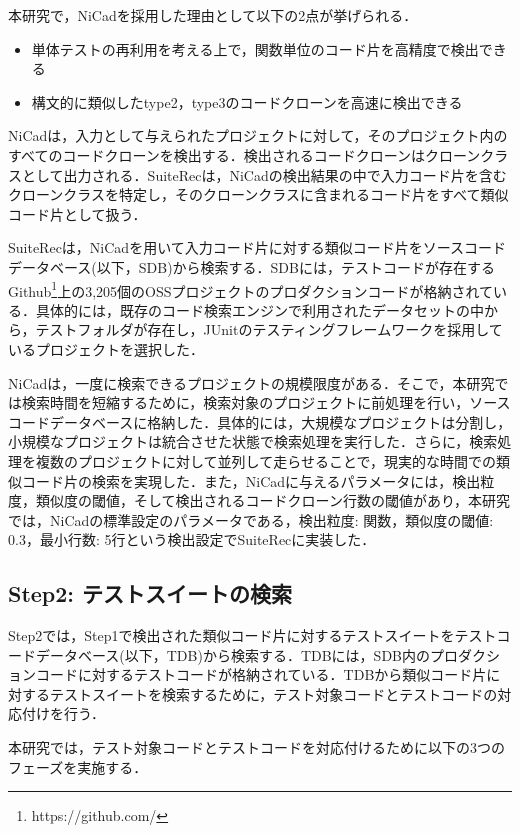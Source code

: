 \documentclass[12pt]{jarticle} %
\begin{document}
本研究で，{\sf NiCad}を採用した理由として以下の2点が挙げられる．

\begin{itemize}
\item 単体テストの再利用を考える上で，関数単位のコード片を高精度で検出できる
\item 構文的に類似したtype2，type3のコードクローンを高速に検出できる
\end{itemize}


{\sf NiCad}は，入力として与えられたプロジェクトに対して，そのプロジェクト内のすべてのコードクローンを検出する．検出されるコードクローンはクローンクラスとして出力される．{\sf SuiteRec}は，{\sf NiCad}の検出結果の中で入力コード片を含むクローンクラスを特定し，そのクローンクラスに含まれるコード片をすべて類似コード片として扱う．

{\sf SuiteRec}は，{\sf NiCad}を用いて入力コード片に対する類似コード片をソースコードデータベース(以下，SDB)から検索する．SDBには，テストコードが存在するGithub\footnote{https://github.com/}上の3,205個のOSSプロジェクトのプロダクションコードが格納されている．具体的には，既存のコード検索エンジンで利用されたデータセット\cite{FaCoY}の中から，テストフォルダが存在し，JUnitのテスティングフレームワークを採用しているプロジェクトを選択した．

{\sf NiCad}は，一度に検索できるプロジェクトの規模限度がある．そこで，本研究では検索時間を短縮するために，検索対象のプロジェクトに前処理を行い，ソースコードデータベースに格納した．具体的には，大規模なプロジェクトは分割し，小規模なプロジェクトは統合させた状態で検索処理を実行した．さらに，検索処理を複数のプロジェクトに対して並列して走らせることで，現実的な時間での類似コード片の検索を実現した．また，{\sf NiCad}に与えるパラメータには，検出粒度，類似度の閾値，そして検出されるコードクローン行数の閾値があり，本研究では，{\sf NiCad}の標準設定のパラメータである，検出粒度: 関数，類似度の閾値: 0.3，最小行数: 5行という検出設定で{\sf SuiteRec}に実装した．

\subsection{Step2: テストスイートの検索}
Step2では，Step1で検出された類似コード片に対するテストスイートをテストコードデータベース(以下，TDB)から検索する．TDBには，SDB内のプロダクションコードに対するテストコードが格納されている．TDBから類似コード片に対するテストスイートを検索するために，テスト対象コードとテストコードの対応付けを行う．

本研究では，テスト対象コードとテストコードを対応付けるために以下の3つのフェーズを実施する．
\end{document}
